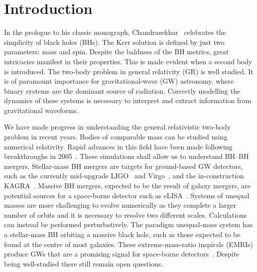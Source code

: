 \documentclass[aps,prd,amsfonts,amssymb,amsmath,nofootinbib,reprint,showpacs,superscriptaddress,twocolumn]{revtex4}
\begin{document}
\section{Introduction}

In the prologue to his classic monograph, Chandrasekhar~\cite{Chandrasekhar1992} celebrates the simplicity of black holes (BHs). The Kerr solution is defined by just two parameters: mass and spin. Despite the baldness of the BH metrics, great intricacies manifest in their properties. This is made evident when a second body is introduced. The two-body problem in general relativity (GR) is well studied. It is of paramount importance for gravitational-wave (GW) astronomy, where binary systems are the dominant source of radiation. Correctly modelling the dynamics of these systems is necessary to interpret and extract information from gravitational waveforms.

We have made progress in understanding the general relativistic two-body problem in recent years. Bodies of comparable mass can be studied using numerical relativity. Rapid advances in this field have been made following breakthroughs in 2005~\cite{Pretorius2005,Campanelli2006,Baker2006}. These simulations shall allow us to understand BH--BH mergers. Stellar-mass BH mergers are targets for ground-based GW detectors, such as the currently mid-upgrade LIGO~\cite{Harry2010} and Virgo~\cite{Accadia2011}, and the in-construction KAGRA~\cite{Kuroda2010}. Massive BH mergers, expected to be the result of galaxy mergers, are potential sources for a space-borne detector such as eLISA~\cite{Amaro-Seoane2012a}. Systems of unequal masses are more challenging to evolve numerically as they complete a larger number of orbits and it is necessary to resolve two different scales. Calculations can instead be performed perturbatively. The paradigm unequal-mass system has a stellar-mass BH orbiting a massive black hole, such as those expected to be found at the centre of most galaxies. These extreme-mass-ratio inspirals (EMRIs) produce GWs that are a promising signal for space-borne detectors~\cite{Amaro-Seoane2007}. Despite being well-studied there still remain open questions.
\end{document}
